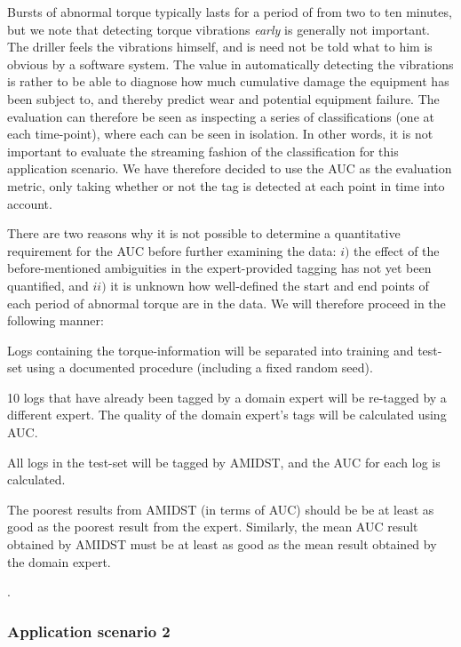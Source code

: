 Bursts of abnormal torque typically lasts for a period of from two to ten minutes, but we note that detecting torque vibrations \textit{early} is generally not important.  
The driller feels the vibrations himself, and is need not be told what to him is obvious by a software system.  
The value in automatically detecting the vibrations is rather to be able to diagnose how much cumulative damage  the equipment has been subject to, and thereby predict  wear and potential equipment failure. 
The evaluation can therefore be seen as inspecting a series of classifications (one at each time-point), where each can be seen in isolation.
In other words, it is not important to evaluate  the streaming fashion of the classification for this application scenario. 
We have therefore decided to use  the AUC as the evaluation metric, only taking whether or not the tag is detected at each point in time  into account.  

There are two reasons why it is not possible to determine a quantitative requirement for the AUC  before further examining the data: 
$i)$ the effect of the before-mentioned ambiguities in the expert-provided tagging has not yet been quantified, and 
$ii)$ it is  unknown how well-defined the start and end points of each period of abnormal torque are in the data. 
We will therefore proceed in the following manner:
\ben
\item Logs containing the torque-information will be separated into training and test-set using a documented procedure (including a fixed random seed).
\item 10 logs that have already been tagged by a domain expert will be re-tagged by a different expert. The quality of the  domain expert's tags will be calculated using AUC.
\item All logs in the test-set will be tagged by AMIDST, and the AUC for each log is calculated.
\item The poorest results from AMIDST (in terms of AUC) should be be at least as good as the poorest result from the expert. Similarly,  the mean AUC result obtained by  AMIDST must be at least as good as the mean result obtained by the domain expert.
\een











.  



\subsubsection{Application scenario 2}

